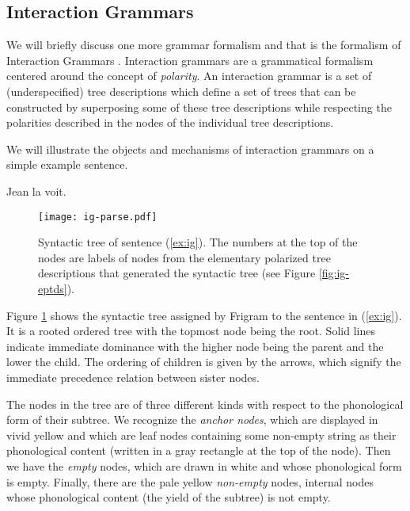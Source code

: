 \subsection{Interaction Grammars}

We will briefly discuss one more grammar formalism and that is the
formalism of Interaction Grammars \cite{guillaume2009interaction}.
Interaction grammars are a grammatical formalism centered around the
concept of \emph{polarity}. An interaction grammar is a set of
(underspecified) tree descriptions which define a set of trees that can
be constructed by superposing some of these tree descriptions while
respecting the polarities described in the nodes of the individual tree
descriptions.

We will illustrate the objects and mechanisms of interaction grammars on
a simple example sentence.

\begin{exe}
  \ex \label{ex:ig} Jean la voit.
\end{exe}

\begin{figure}
  \centering
  \texttt{[image: ig-parse.pdf]}
  \caption{\label{fig:ig-parse} Syntactic tree of sentence
    (\ref{ex:ig}). The numbers at the top of the nodes are labels of
    nodes from the elementary polarized tree descriptions that generated
    the syntactic tree (see Figure \ref{fig:ig-eptds}).}
\end{figure}

Figure \ref{fig:ig-parse} shows the syntactic tree assigned by Frigram
to the sentence in (\ref{ex:ig}). It is a rooted ordered tree with the
topmost node being the root. Solid lines indicate immediate dominance
with the higher node being the parent and the lower the child. The
ordering of children is given by the arrows, which signify the immediate
precedence relation between sister nodes.

The nodes in the tree are of three different kinds with respect to the
phonological form of their subtree. We recognize the \emph{anchor
  nodes}, which are displayed in vivid yellow and which are leaf nodes
containing some non-empty string as their phonological content (written
in a gray rectangle at the top of the node). Then we have the
\emph{empty} nodes, which are drawn in white and whose phonological form
is empty. Finally, there are the pale yellow \emph{non-empty} nodes,
internal nodes whose phonological content (the yield of the subtree) is
not empty.

